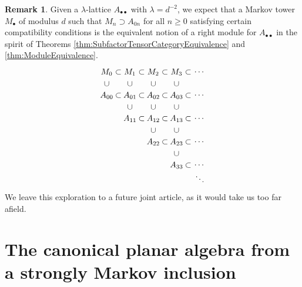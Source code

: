 \documentclass[11pt]{article}
\theoremstyle{plain}
\theoremstyle{definition}
\newtheorem{rem}[thm]{Remark}
\begin{document}
\begin{rem}
\label{rem:LambdaLatticeModule}
Given a $\lambda$-lattice $A_{\bullet\bullet}$ with $\lambda = d^{-2}$, we expect that a Markov tower $M_\bullet$ of modulus $d$ such that $M_n \supset A_{0n}$ for all $n\geq 0$ satisfying certain compatibility conditions is the equivalent notion of a right module for $A_{\bullet\bullet}$ in the spirit of Theorems \ref{thm:SubfactorTensorCategoryEquivalence} and \ref{thm:ModuleEquivalence}.
$$
\begin{tikzpicture}
	\node at (0,1) {$M_{0}$};
	\node at (.5,1) {$\subset$};
	\node at (1,1) {$M_{1}$};
	\node at (1.5,1) {$\subset$};
	\node at (2,1) {$M_{2}$};
	\node at (2.5,1) {$\subset$};
	\node at (3,1) {$M_{3}$};
	\node at (3.5,1) {$\subset$};
	\node at (4,1) {$\cdots$};
%
	\node at (0,.5) {$\cup$};
	\node at (1,.5) {$\cup$};
	\node at (2,.5) {$\cup$};
	\node at (3,.5) {$\cup$};
%
	\node at (0,0) {$A_{00}$};
	\node at (.5,0) {$\subset$};
	\node at (1,0) {$A_{01}$};
	\node at (1.5,0) {$\subset$};
	\node at (2,0) {$A_{02}$};
	\node at (2.5,0) {$\subset$};
	\node at (3,0) {$A_{03}$};
	\node at (3.5,0) {$\subset$};
	\node at (4,0) {$\cdots$};
%
	\node at (1,-.5) {$\cup$};
	\node at (2,-.5) {$\cup$};
	\node at (3,-.5) {$\cup$};
%
	\node at (1,-1) {$A_{11}$};
	\node at (1.5,-1) {$\subset$};
	\node at (2,-1) {$A_{12}$};
	\node at (2.5,-1) {$\subset$};
	\node at (3,-1) {$A_{13}$};
	\node at (3.5,-1) {$\subset$};
	\node at (4,-1) {$\cdots$};
%
	\node at (2,-1.5) {$\cup$};
	\node at (3,-1.5) {$\cup$};
%
	\node at (2,-2) {$A_{22}$};
	\node at (2.5,-2) {$\subset$};
	\node at (3,-2) {$A_{23}$};
	\node at (3.5,-2) {$\subset$};
	\node at (4,-2) {$\cdots$};
%
	\node at (3,-2.5) {$\cup$};
%
	\node at (3,-3) {$A_{33}$};
	\node at (3.5,-3) {$\subset$};
	\node at (4,-3) {$\cdots$};
%
	\node at (4,-3.5) {$\ddots$};
\end{tikzpicture}
$$
We leave this exploration to a future joint article, as it would take us too far afield.
\end{rem}







\section{The canonical planar algebra from a strongly Markov inclusion} 
\end{document}
